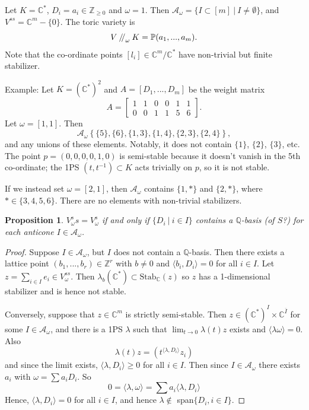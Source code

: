 \documentclass{article}
\newtheorem{prop}[theorem]{Proposition}
\theoremstyle{definition}
\theoremstyle{remark}
\numberwithin{theorem}{section}
\newcommand{\C}{\mathbb{C}}
\newcommand{\Z}{\mathbb{Z}}
\newcommand{\bP}{\mathbb{P}}
\newcommand{\sslash}{\mathbin{/\mkern-4mu/}}
\begin{document}
	Let $K=\C^\ast$, $D_i = a_i \in \Z_{\geq 0}$ and $\omega =1$. Then $\mathcal{A}_\omega = \{I \subset [m] ~|~ I \neq \emptyset\}$, and $V^{ss} = \C^m - \{0\}$. The toric variety is 
	$$V\sslash_\omega K = \bP(a_1,...,a_m).$$
	Note that the co-ordinate points $[l_i] \in \C^m/\C^\ast$ have non-trivial but finite stabilizer. \vspace*{1em}
	
	Example: Let $K=(\C^\ast)^2$ and $A=[D_1,...,D_m]$ be the weight matrix
	$$A = \begin{bmatrix}
		1 & 1 & 0 & 0 & 1 & 1\\
		0 & 0 & 1 & 1 & 5 & 6
	\end{bmatrix}.$$
	Let $\omega = [1,1]$. Then 
	$$\mathcal{A}_\omega \left\{
	\{5\}, \{6\}, \{1,3\}, \{1,4\}, \{2,3\}, \{2,4\}
	\right\},$$
	and any unions of these elements. Notably, it does not contain $\{1\}$, $\{2\}$, $\{3\}$, etc. The point $p=(0,0,0,0,1,0)$ is semi-stable because it doesn't vanish in the 5th co-ordinate; the 1PS $(t,t^{-1})\subset K$ acts trivially on $p$, so it is not stable. \vspace*{1em} 

	If we instead set $\omega = [2,1]$, then $\mathcal{A}_\omega$ contains $\{1,\ast\}$ and $\{2,\ast\}$, where $\ast\in \{3,4,5,6\}$. There are no elements with non-trivial stabilizers.

	\begin{prop}
		$V_\omega^ss = V^s_\omega$ if and only if $\{D_i ~|~ i \in I\}$ contains a $\mathbb{Q}$-basis (of $S$?) for \emph{each} anticone $I\in\mathcal{A}_\omega$.
	\end{prop}
	\begin{proof}
		Suppose $I \in \mathcal{A}_\omega$, but $I$ does not contain a $\mathbb{Q}$-basis. Then there exists a lattice point $(b_1,...,b_r) \in \Z^r$  with $b\neq 0$ and $\langle b_i, D_i\rangle =0$ for all $i\in I$. Let $z = \sum_{i\in I} e_i \in V^{ss}_\omega$. Then $\lambda_b(\C^\ast) \subset \text{Stab}_\C(z)$ so $z$ has a 1-dimensional stabilizer and is hence not stable. \vspace{1em}

		Conversely, suppose that $z\in \C^m$ is strictly semi-stable. Then $z\in(\C^\ast)^I\times \C^{\overline{I}}$ for some $I\in \mathcal{A}_\omega$, and there is a 1PS $\lambda$ such that $\lim_{t\to 0}\lambda(t)z$ exists and $\langle \lambda \omega \rangle =0$. Also
		$$\lambda(t) z = (t^{\langle \lambda, D_i\rangle}z_i)$$
		and since the limit exists, $\langle \lambda , D_i \rangle \geq 0$ for all $i\in I$. Then since $I\in\mathcal{A}_\omega$ there exists $a_i$ with $\omega = \sum a_i D_i$. So
		$$0 = \langle \lambda, \omega \rangle = \sum a_i \langle \lambda, D_i \rangle$$
		Hence, $\langle \lambda, D_i \rangle = 0$ for all $i\in I$, and hence $\lambda \not\in$ span$\{D_i, i\in I\}$. 
	\end{proof}
\end{document}
